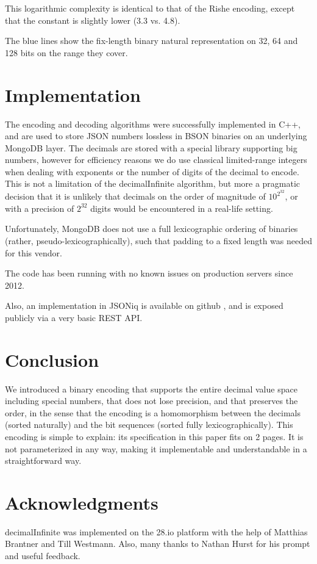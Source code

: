 \documentclass[final,leqno,onefignum,onetabnum]{siamltex1213}
\begin{document}
This logarithmic complexity is identical to that of the Rishe encoding, except that the constant is slightly lower (3.3 vs. 4.8).

The blue lines show the fix-length binary natural representation on 32, 64 and 128 bits on the range they cover.



\section{Implementation}
\label{section-implementation}
The encoding and decoding algorithms were successfully implemented in C++, and are used to store JSON numbers lossless in BSON binaries on an underlying MongoDB layer. The decimals are stored with a special library supporting big numbers, however for efficiency reasons we do use classical limited-range integers when dealing with exponents or the number of digits of the decimal to encode. This is not a limitation of the decimalInfinite algorithm, but more a pragmatic decision that it is unlikely that decimals on the order of magnitude of $10^{2^{32}}$, or with a precision of $2^{32}$ digits would be encountered in a real-life setting.

Unfortunately, MongoDB does not use a full lexicographic ordering of binaries (rather, pseudo-lexicographically), such that padding to a fixed length was needed for this vendor.

The code has been running with no known issues on production servers since 2012.

Also, an implementation in JSONiq is available on github \cite{decimalInfiniteJSONiq}, and is exposed publicly via a very basic REST API.

\section{Conclusion}

We introduced a binary encoding that supports the entire decimal value space including special numbers, that does not lose precision, and that preserves the order, in the sense that the encoding is a homomorphism between the decimals (sorted naturally) and the bit sequences (sorted fully lexicographically). This encoding is simple to explain: its specification in this paper fits on 2 pages. It is not parameterized in any way, making it implementable and understandable in a straightforward way.

\section{Acknowledgments}
decimalInfinite was implemented on the 28.io platform with the help of Matthias Brantner and Till Westmann. Also, many thanks to Nathan Hurst for his prompt and useful feedback.
\end{document}
